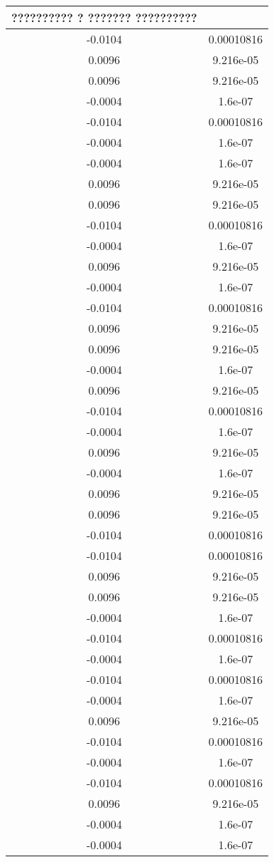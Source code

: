 \documentclass{article}
\begin{document}
\begin{tabular}{|c|c|}
\hline
?????????? ? ??????? ?????????? \\
\hline
-0.0104 & 0.00010816 \\
0.0096 & 9.216e-05 \\
0.0096 & 9.216e-05 \\
-0.0004 & 1.6e-07 \\
-0.0104 & 0.00010816 \\
-0.0004 & 1.6e-07 \\
-0.0004 & 1.6e-07 \\
0.0096 & 9.216e-05 \\
0.0096 & 9.216e-05 \\
-0.0104 & 0.00010816 \\
-0.0004 & 1.6e-07 \\
0.0096 & 9.216e-05 \\
-0.0004 & 1.6e-07 \\
-0.0104 & 0.00010816 \\
0.0096 & 9.216e-05 \\
0.0096 & 9.216e-05 \\
-0.0004 & 1.6e-07 \\
0.0096 & 9.216e-05 \\
-0.0104 & 0.00010816 \\
-0.0004 & 1.6e-07 \\
0.0096 & 9.216e-05 \\
-0.0004 & 1.6e-07 \\
0.0096 & 9.216e-05 \\
0.0096 & 9.216e-05 \\
-0.0104 & 0.00010816 \\
-0.0104 & 0.00010816 \\
0.0096 & 9.216e-05 \\
0.0096 & 9.216e-05 \\
-0.0004 & 1.6e-07 \\
-0.0104 & 0.00010816 \\
-0.0004 & 1.6e-07 \\
-0.0104 & 0.00010816 \\
-0.0004 & 1.6e-07 \\
0.0096 & 9.216e-05 \\
-0.0104 & 0.00010816 \\
-0.0004 & 1.6e-07 \\
-0.0104 & 0.00010816 \\
0.0096 & 9.216e-05 \\
-0.0004 & 1.6e-07 \\
-0.0004 & 1.6e-07 \\

\end{tabular}
\end{document}
